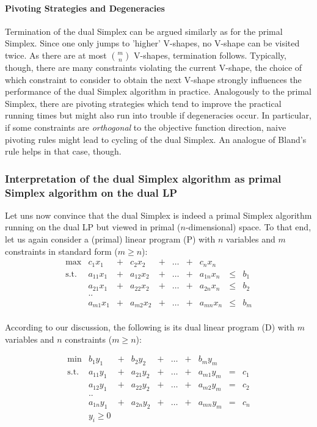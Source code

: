 \documentclass{article}
\begin{document}
\paragraph{Pivoting Strategies and Degeneracies}
Termination of the dual Simplex can be argued similarly as for the primal Simplex. Since one only jumps to 'higher' V-shapes, no V-shape can be visited twice. As there are at most $m \choose n$ V-shapes, termination follows. Typically, though, there are many constraints violating the current V-shape, the choice of which constraint to consider to obtain the next V-shape strongly influences the performance of the dual Simplex algorithm in practice. Analogously to the primal Simplex, there are pivoting strategies which tend to improve the practical running times but might also run into trouble if degeneracies occur. In particular, if some constraints are \emph{orthogonal} to the objective function direction, naive pivoting rules might lead to cycling of the dual Simplex. An analogue of Bland's rule helps in that case, though.

\subsubsection{Interpretation of the dual Simplex algorithm as primal Simplex algorithm on the dual LP}
Let uns now convince that the dual Simplex is indeed a primal Simplex algorithm running on the dual LP but viewed in primal ($n$-dimensional) space. To that end, let us again consider a (primal) linear program (P) with $n$ variables and $m$ constraints in standard form ($m\geq n$): 	
\[
\begin{matrix}
	\max	& c_1 x_1 &+& c_2 x_2 &+& \dots &+& c_n x_n&&\\  
	\mbox{s.t.}	& a_{11} x_1 &+& a_{12} x_2&+& \dots &+&a_{1n} x_n&\leq&b_1\\
			& a_{21} x_1 &+& a_{22} x_2&+& \dots &+&a_{2n} x_n&\leq&b_2\\
			& ..	&&&&&&&&\\
			& a_{m1} x_1 &+& a_{m2} x_2&+& \dots &+&a_{mn} x_n&\leq&b_m\\
\end{matrix}
\]

According to our discussion, the following is its dual linear program (D) with $m$ variables and $n$ constraints ($m\geq n$): 

\[
\begin{matrix}
	\min& b_1 y_1 &+& b_2 y_2 &+& \dots &+& b_m y_m&&\\  
	\mbox{s.t.}	& a_{11} y_1 &+& a_{21} y_2&+& \dots &+&a_{m1} y_m&=&c_1\\
			& a_{12} y_1 &+& a_{22} y_2&+& \dots &+&a_{m2} y_m&=&c_2\\
			& ..	&&&&&&&&\\
			& a_{1n} y_1 &+& a_{2n} y_2&+& \dots &+&a_{mn} y_m&=&c_n\\
			& y_i\geq 0\\
\end{matrix}
\]
\end{document}
